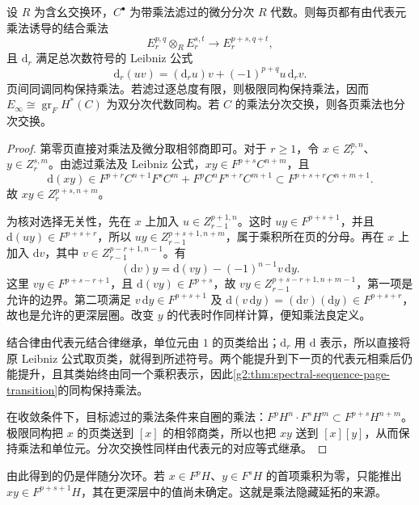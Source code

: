 \begin{proposition}\label{g2:prop:multiplicative-spectral-sequence}
	设 \(R\) 为含幺交换环，\(C^\bullet\) 为带乘法滤过的微分分次 \(R\) 代数。则每页都有由代表元乘法诱导的结合乘法
	\[
		E_r^{p,q}\otimes_RE_r^{s,t}\longrightarrow E_r^{p+s,q+t},
	\]
	且 \(\mathrm d_r\) 满足总次数符号的 Leibniz 公式
	\[
		\mathrm d_r(uv)=(\mathrm d_ru)v+(-1)^{p+q}u\,\mathrm d_rv.
	\]
	页间同调同构保持乘法。若滤过逐总度有限，则极限同构保持乘法，因而 \(E_\infty\cong\operatorname{gr}_FH^*(C)\) 为双分次代数同构。若 \(C\) 的乘法分次交换，则各页乘法也分次交换。
\end{proposition}
\begin{proof}
	第零页直接对乘法及微分取相邻商即可。对于 \(r\ge1\)，令 \(x\in Z_r^{p,n}\)、\(y\in Z_r^{s,m}\)。由滤过乘法及 Leibniz 公式，\(xy\in F^{p+s}C^{n+m}\)，且
	\[
		\mathrm d(xy)\in F^{p+r}C^{n+1}F^sC^m+F^pC^nF^{s+r}C^{m+1}
		\subset F^{p+s+r}C^{n+m+1}.
	\]
	故 \(xy\in Z_r^{p+s,n+m}\)。

	为核对选择无关性，先在 \(x\) 上加入 \(u\in Z_{r-1}^{p+1,n}\)。这时 \(uy\in F^{p+s+1}\)，并且 \(\mathrm d(uy)\in F^{p+s+r}\)，所以 \(uy\in Z_{r-1}^{p+s+1,n+m}\)，属于乘积所在页的分母。再在 \(x\) 上加入 \(\mathrm dv\)，其中 \(v\in Z_{r-1}^{p-r+1,n-1}\)。有
	\[
		(\mathrm dv)y=\mathrm d(vy)-(-1)^{n-1}v\,\mathrm dy.
	\]
	这里 \(vy\in F^{p+s-r+1}\)，且 \(\mathrm d(vy)\in F^{p+s}\)，故 \(vy\in Z_{r-1}^{p+s-r+1,n+m-1}\)，第一项是允许的边界。第二项满足 \(v\,\mathrm dy\in F^{p+s+1}\) 及 \(\mathrm d(v\,\mathrm dy)=(\mathrm dv)(\mathrm dy)\in F^{p+s+r}\)，故也是允许的更深层圈。改变 \(y\) 的代表时作同样计算，便知乘法良定义。

	结合律由代表元结合律继承，单位元由 \(1\) 的页类给出；\(\mathrm d_r\) 用 \(\mathrm d\) 表示，所以直接将原 Leibniz 公式取页类，就得到所述符号。两个能提升到下一页的代表元相乘后仍能提升，且其类始终由同一个乘积表示，因此\cref{g2:thm:spectral-sequence-page-transition}的同构保持乘法。

	在收敛条件下，目标滤过的乘法条件来自圈的乘法：\(F^pH^n\cdot F^sH^m\subset F^{p+s}H^{n+m}\)。极限同构把 \(x\) 的页类送到 \([x]\) 的相邻商类，所以也把 \(xy\) 送到 \([x][y]\)，从而保持乘法和单位元。分次交换性同样由代表元的对应等式继承。
\end{proof}

由此得到的仍是伴随分次环。若 \(x\in F^pH\)、\(y\in F^sH\) 的首项乘积为零，只能推出 \(xy\in F^{p+s+1}H\)，其在更深层中的值尚未确定。这就是乘法隐藏延拓的来源。

